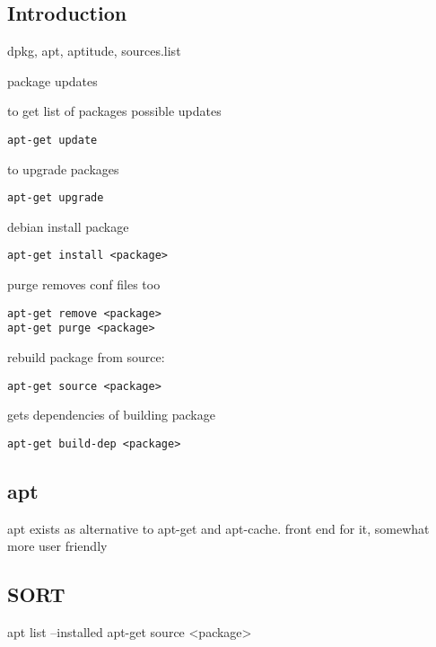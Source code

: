 
\subsection{Introduction}

dpkg, apt, aptitude, sources.list

package updates

to get list of packages possible updates

\begin{verbatim}
apt-get update
\end{verbatim}

to upgrade packages
\begin{verbatim}
apt-get upgrade
\end{verbatim}

debian install package

\begin{verbatim}
apt-get install <package>
\end{verbatim}

purge removes conf files too
\begin{verbatim}
apt-get remove <package>
apt-get purge <package>
\end{verbatim}


rebuild package from source:
\begin{verbatim}
apt-get source <package>
\end{verbatim}

gets dependencies of building package

\begin{verbatim}
apt-get build-dep <package>
\end{verbatim}

\subsection{apt}
apt exists as alternative to apt-get and apt-cache. front end for it, somewhat more user friendly


\subsection{SORT}
apt list --installed
apt-get source <package>

